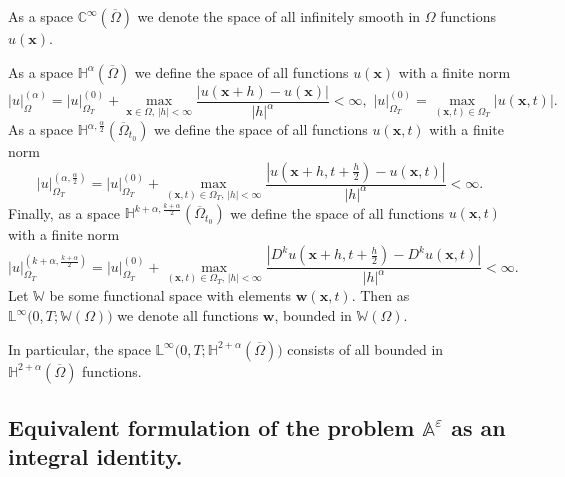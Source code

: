 \documentclass{article}
\theoremstyle{plain}
\theoremstyle{definition}
\numberwithin{equation}{section}
\begin{document}
As a space $\mathbb{C}^{\infty}(\overline{\Omega})$ we denote the space of all infinitely smooth in $\Omega$ functions $u(\boldsymbol{x})$.

As a space $\mathbb{H}^{\alpha}(\overline{\Omega})$ we define the space of all functions $u(\boldsymbol{x})$ with a finite norm
\begin{equation*}
|u|^{(\alpha)}_{\Omega}=|u|^{(0)}_{\Omega_{T}}+\max_{\boldsymbol{x}\in\Omega,\,|h|<\infty}
\frac{|u(\boldsymbol{x}+h)-u(\boldsymbol{x})|}{|h|^{\alpha}}<\infty,\,\,
|u|^{(0)}_{\Omega_{T}}=\max_{(\boldsymbol{x},t)\in\Omega_{T}}|u(\boldsymbol{x},t)|.
\end{equation*}
As a space $\mathbb{H}^{\alpha,\frac{\alpha}{2}}(\overline{\Omega}_{t_{0}})$
we define the space of all functions $u(\boldsymbol{x},t)$ with a finite norm
\begin{equation*}
|u|^{(\alpha,\frac{\alpha}{2})}_{\Omega_{T}}=|u|^{(0)}_{\Omega_{T}}+
\max_{(\boldsymbol{x},t)\in\Omega_{T},\,|h|<\infty}
\frac{|u(\boldsymbol{x}+h,t+\frac{h}{2})-u(\boldsymbol{x},t)|}{|h|^{\alpha}}<\infty.
\end{equation*}
Finally, as a space $\mathbb{H}^{k+\alpha,\frac{k+\alpha}{2}}(\overline{\Omega}_{t_{0}})$ we define the space of all functions $u(\boldsymbol{x},t)$ with a finite norm
\begin{equation*}
|u|^{(k+\alpha,\frac{k+\alpha}{2})}_{\Omega_{T}}=|u|^{(0)}_{\Omega_{T}}+
\max_{(\boldsymbol{x},t)\in\Omega_{T},\,|h|<\infty}
\frac{|D^{k}u(\boldsymbol{x}+h,t+\frac{h}{2})-D^{k}u(\boldsymbol{x},t)|}{|h|^{\alpha}}<\infty.
\end{equation*}
Let $\mathbb{W}$ be some functional space with elements $\boldsymbol{w}(\boldsymbol{x},t)$.
Then as $\mathbb{L}^{\infty}\big(0,T;\mathbb{W}(\Omega)\big)$ we denote all functions $\boldsymbol{w}$, bounded in $\mathbb{W}(\Omega)$.

In particular, the space $\mathbb{L}^{\infty}\big(0,T;\mathbb{H}^{2+\alpha}(\overline{\Omega})\big)$ consists of all bounded in $\mathbb{H}^{2+\alpha}(\overline{\Omega})$ functions.

\subsection{Equivalent formulation of the problem $\mathbb{A}^{\varepsilon}$ as an integral identity.}
\end{document}

